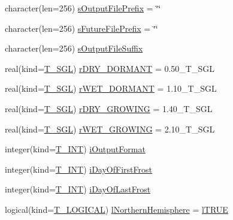 \begin{DoxyCompactItemize}
character(len=256) \hyperlink{typetypes_1_1_t___m_o_d_e_l___c_o_n_f_i_g_u_r_a_t_i_o_n_a51840c9e975db1983843253c9e928797}{sOutputFilePrefix} = \char`\"{}\char`\"{}
\item 
character(len=256) \hyperlink{typetypes_1_1_t___m_o_d_e_l___c_o_n_f_i_g_u_r_a_t_i_o_n_a0c3965ad6d9a38fa8a987d718c8615cc}{sFutureFilePrefix} = \char`\"{}\char`\"{}
\item 
character(len=256) \hyperlink{typetypes_1_1_t___m_o_d_e_l___c_o_n_f_i_g_u_r_a_t_i_o_n_a1a5446e2c56d0b520a3c3db5e6216b4a}{sOutputFileSuffix}
\item 
real(kind=\hyperlink{namespacetypes_af3012489af4c138f271f1bce244b7e51}{T\_\-SGL}) \hyperlink{typetypes_1_1_t___m_o_d_e_l___c_o_n_f_i_g_u_r_a_t_i_o_n_a9cbb49e61c26c80a977eda1cebe6ff66}{rDRY\_\-DORMANT} = 0.50\_\-T\_\-SGL
\item 
real(kind=\hyperlink{namespacetypes_af3012489af4c138f271f1bce244b7e51}{T\_\-SGL}) \hyperlink{typetypes_1_1_t___m_o_d_e_l___c_o_n_f_i_g_u_r_a_t_i_o_n_abc74ede52f5982a8acfcacb9c636be63}{rWET\_\-DORMANT} = 1.10\_\-T\_\-SGL
\item 
real(kind=\hyperlink{namespacetypes_af3012489af4c138f271f1bce244b7e51}{T\_\-SGL}) \hyperlink{typetypes_1_1_t___m_o_d_e_l___c_o_n_f_i_g_u_r_a_t_i_o_n_a59bd3ec210409890bac9ff46b74789e8}{rDRY\_\-GROWING} = 1.40\_\-T\_\-SGL
\item 
real(kind=\hyperlink{namespacetypes_af3012489af4c138f271f1bce244b7e51}{T\_\-SGL}) \hyperlink{typetypes_1_1_t___m_o_d_e_l___c_o_n_f_i_g_u_r_a_t_i_o_n_a4d0ab1616b636849b4dc5d38f7670006}{rWET\_\-GROWING} = 2.10\_\-T\_\-SGL
\item 
integer(kind=\hyperlink{namespacetypes_a4e4d040a4425196c4d43be63e7e6103a}{T\_\-INT}) \hyperlink{typetypes_1_1_t___m_o_d_e_l___c_o_n_f_i_g_u_r_a_t_i_o_n_a4be49786d89fd8779eef94a907b5a1c8}{iOutputFormat}
\item 
integer(kind=\hyperlink{namespacetypes_a4e4d040a4425196c4d43be63e7e6103a}{T\_\-INT}) \hyperlink{typetypes_1_1_t___m_o_d_e_l___c_o_n_f_i_g_u_r_a_t_i_o_n_a80bc3d1d4069de4e9c85c36dab171bb2}{iDayOfFirstFrost}
\item 
integer(kind=\hyperlink{namespacetypes_a4e4d040a4425196c4d43be63e7e6103a}{T\_\-INT}) \hyperlink{typetypes_1_1_t___m_o_d_e_l___c_o_n_f_i_g_u_r_a_t_i_o_n_a650bf97d4890d1fbde02542737cb79ca}{iDayOfLastFrost}
\item 
logical(kind=\hyperlink{namespacetypes_adfa8f4f6096bb7bdbb93f36b911dcaad}{T\_\-LOGICAL}) \hyperlink{typetypes_1_1_t___m_o_d_e_l___c_o_n_f_i_g_u_r_a_t_i_o_n_a932d20830fb29ba127ef4b62868a5fe9}{lNorthernHemisphere} = \hyperlink{namespacetypes_a440f71bd0dd529ae3aaa8309171baa67}{lTRUE}

\end{DoxyCompactItemize}
